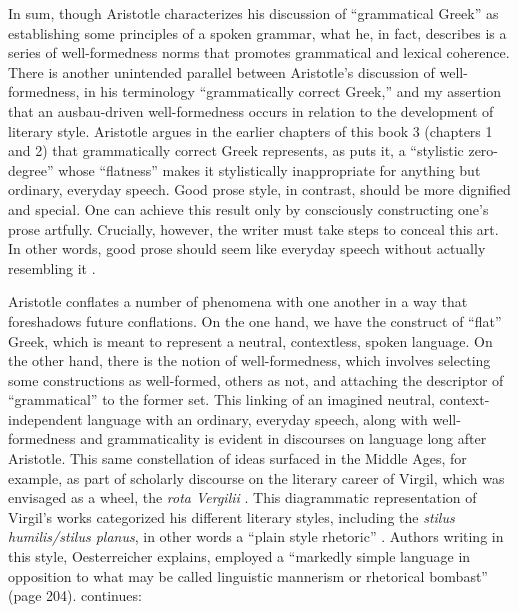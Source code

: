 In sum, though Aristotle characterizes his discussion of “grammatical Greek” as establishing some principles of a spoken grammar, what he, in fact, describes is a series of well-formedness norms that promotes grammatical and lexical coherence. There is another unintended parallel between Aristotle’s discussion of well-formedness, in his terminology “grammatically correct Greek,” and my assertion that an ausbau-driven well-formedness occurs in relation to the development of literary style. Aristotle argues in the earlier chapters of this book 3 (chapters 1 and 2) that grammatically correct Greek represents, as \citet[314]{Graff2005} puts it, a “stylistic zero-degree” whose “flatness” makes it stylistically inappropriate for anything but ordinary, everyday speech. Good prose style, in contrast, should be more dignified and special. One can achieve this result only by consciously constructing one’s prose artfully. Crucially, however, the writer must take steps to conceal this art. In other words, good prose should seem like everyday speech without actually resembling it \citep[314--317]{Graff2005}.

\begin{sloppypar}
Aristotle conflates a number of phenomena with one another in a way that foreshadows future conflations. On the one hand, we have the construct of “flat” Greek, which is meant to represent a neutral, contextless, spoken language. On the other hand, there is the notion of well-formedness, which involves selecting some constructions as well-formed, others as not, and attaching the descriptor of “grammatical” to the former set.  This linking of an imagined neutral, context-independent language with an ordinary, everyday speech, along with well\hyp formedness and grammaticality is evident in discourses on language long after Aristotle. This same constellation of ideas surfaced in the Middle Ages, for example, as part of scholarly discourse on the literary career of Virgil, which was envisaged as a wheel, the \textit{rota Vergilii} \citep[138]{Laird2010}. This diagrammatic representation of Virgil’s works categorized his different literary styles, including the \textit{stilus humilis/stilus planus}, in other words a “plain style rhetoric” \citep[204--205]{Oesterreicher1997}. Authors writing in this style, Oesterreicher explains, employed a “markedly simple language in opposition to what may be called linguistic mannerism or rhetorical bombast” (page 204). \citet[204--205]{Oesterreicher1997} continues:
\end{sloppypar}

